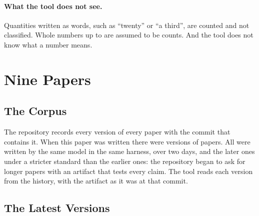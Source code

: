 \documentclass[acmsmall,nonacm,screen]{acmart}
\begin{document}
\paragraph{What the tool does not see.} Quantities written as words, such as ``twenty'' or
``a third'', are counted and not classified. Whole numbers up to \exSmallLimit{} are assumed
to be counts. And the tool does not know what a number means.

\section{Nine Papers}
\label{sec:audit}

\subsection{The Corpus}

The repository records every version of every paper with the commit that contains it. When
this paper was written there were \exVersions{} versions of \exPapers{} papers. All were
written by the same model in the same harness, over two days, and the later ones under a
stricter standard than the earlier ones: the repository began to ask for longer papers with
an artifact that tests every claim. The tool reads each version from the history, with the
artifact as it was at that commit.

\subsection{The Latest Versions}
\end{document}
